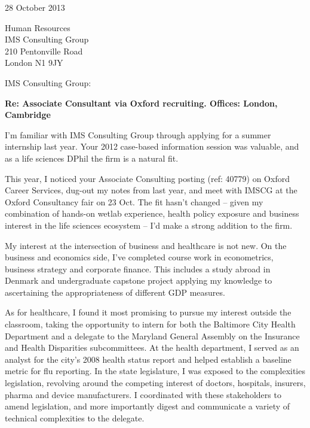 \documentclass{../res}
\begin{document}
 
\begin{sloppypar}
 
%


\begin{resume} 

28 October 2013
\vspace{1\baselineskip}

Human Resources \\
IMS Consulting Group \\
210 Pentonville Road \\
London N1 9JY
\vspace{1\baselineskip}

IMS Consulting Group:

\textbf{Re: Associate Consultant via Oxford recruiting. Offices: London, Cambridge}

I'm familiar with IMS Consulting Group through applying for a summer internship last year. Your 2012 case-based information session was valuable, and as a life sciences DPhil the firm is a natural fit. 

This year, I noticed your Associate Consulting posting (ref: 40779) on Oxford Career Services, dug-out my notes from last year, and meet with IMSCG at the Oxford Consultancy fair on 23 Oct. The fit hasn't changed -- given my combination of hands-on wetlab experience, health policy exposure and business interest in the life sciences ecosystem -- I'd make a strong addition to the firm.

My interest at the intersection of business and healthcare is not new. On the business and economics side, I've completed course work in econometrics, business strategy and corporate finance. This includes a study abroad in Denmark and undergraduate capstone project applying my knowledge to ascertaining the appropriateness of different GDP measures. 

As for healthcare, I found it most promising to pursue my interest outside the classroom, taking the opportunity to intern for both the Baltimore City Health Department and a delegate to the Maryland General Assembly on the Insurance and Health Disparities subcommittees. At the health department, I served as an analyst for the city's 2008 health status report and helped establish a baseline metric for flu reporting. In the state legislature, I was exposed to the complexities legislation, revolving around the competing interest of doctors, hospitals, insurers, pharma and device manufacturers. I coordinated with these stakeholders to amend legislation, and more importantly digest and communicate a variety of technical complexities to the delegate.


\end{resume}
\end{sloppypar}
\end{document}
